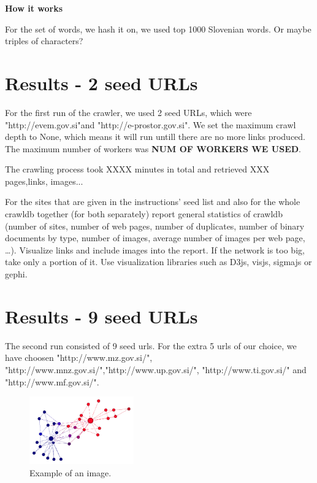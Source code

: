 \documentclass[9pt]{IEEEtran}
\begin{document}
\textbf{How it works}

For the set of words, we hash it on, we used top 1000 Slovenian words. Or maybe triples of characters?


\section{Results - 2 seed URLs}
For the first run of the crawler, we used 2 seed URLs, which were "http://evem.gov.si"and "http://e-prostor.gov.si". We set the maximum crawl depth to None, which means it will run untill there are no more links produced. The maximum number of workers was \textbf{NUM OF WORKERS WE USED}.

The crawling process took XXXX minutes in total and retrieved XXX pages,links, images...

For the sites that are given in the instructions’ seed list and also for the whole crawldb together (for both separately) report general statistics of crawldb (number of sites, number of web pages, number of duplicates, number of binary documents by type, number of images, average number of images per web page, …). Visualize links and include images into the report. If the network is too big, take only a portion of it. Use visualization libraries such as D3js, visjs, sigmajs or gephi.

\section{Results - 9 seed URLs}
The second run consisted of 9 seed urls. For the extra 5 urls of our choice, we have choosen "http://www.mz.gov.si/", "http://www.mnz.gov.si/","http://www.up.gov.si/", "http://www.ti.gov.si/" and "http://www.mf.gov.si/". 




\begin{figure}[h] \centering
    \includegraphics[width=0.4\textwidth]{karate.png}
    \caption{{Example of an image.}}
    \label{fig:karate}
\end{figure}
\end{document}
